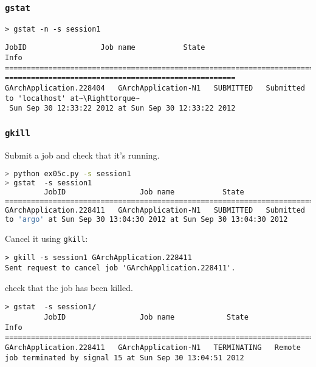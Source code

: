 \documentclass[english,serif,mathserif,xcolor=pdftex,dvipsnames,table]{beamer}
\begin{document}
\begin{frame}[fragile]
  \frametitle{\texttt{gstat}}
  \begin{lstlisting}
> gstat -n -s session1
  \end{lstlisting}
  \begin{lstlisting}[basicstyle=\tt\tiny]
         JobID                 Job name           State                                           Info
=======================================================================================~\Righttorque~
=====================================================
GArchApplication.228404   GArchApplication-N1   SUBMITTED   Submitted to 'localhost' at~\Righttorque~
 Sun Sep 30 12:33:22 2012 at Sun Sep 30 12:33:22 2012
  \end{lstlisting}
\end{frame}

\begin{frame}[fragile]
  \frametitle{\texttt{gkill}}
Submit a job and check that it's running.
\begin{lstlisting}[language=sh,basicstyle=\tt\tiny]
> python ex05c.py -s session1
> gstat  -s session1
         JobID                 Job name           State                                        Info
=======================================================================================================================================
GArchApplication.228411   GArchApplication-N1   SUBMITTED   Submitted
to 'argo' at Sun Sep 30 13:04:30 2012 at Sun Sep 30 13:04:30 2012
\end{lstlisting}

Cancel it using \lstinline|gkill|:
\begin{lstlisting}[basicstyle=\tt\tiny]
> gkill -s session1 GArchApplication.228411
Sent request to cancel job 'GArchApplication.228411'.
\end{lstlisting}

check that the job has been killed.

\begin{lstlisting}[basicstyle=\tt\tiny]
> gstat  -s session1/
         JobID                 Job name            State                                   Info
============================================================================================================================
GArchApplication.228411   GArchApplication-N1   TERMINATING   Remote job terminated by signal 15 at Sun Sep 30 13:04:51 2012
\end{lstlisting}
\end{frame}
\end{document}
